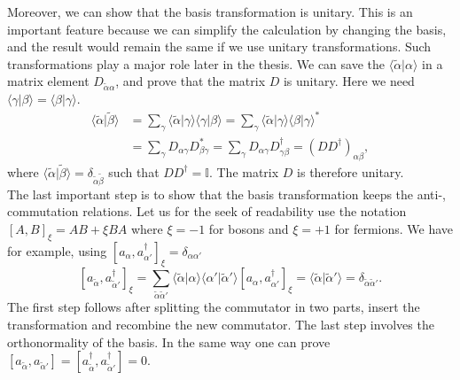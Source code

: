 \documentclass[../main.tex]{subfile}
\begin{document}
Moreover, we can show that the basis transformation is unitary. This is an important feature because we can simplify the calculation by changing the basis, and
the result would remain the same if we use unitary transformations. Such transformations play a major role later in the thesis.
We can save the $\langle \tilde{\alpha} | \alpha\rangle$ in a matrix element $D_{\tilde{\alpha}\alpha}$, and prove that the matrix $D$ is unitary. Here we need
$\langle \gamma | \beta\rangle = \langle \beta | \gamma\rangle$.
\begin{align*}
    \langle \tilde{\alpha} | \tilde{\beta}\rangle  &= \sum_{\gamma} \langle \tilde{\alpha}|\gamma\rangle\langle \gamma | \beta\rangle =  \sum_{\gamma} \langle \tilde{\alpha}|\gamma\rangle \langle \beta | \gamma\rangle^{\ast}\\
    &=\sum_{\gamma} D_{\alpha\gamma}D_{\beta\gamma}^{\ast} = \sum_{\gamma} D_{\alpha\gamma}D^{\dagger}_{\gamma\beta} = (DD^{\dagger})_{\alpha\beta},
\end{align*} 
where $\langle \tilde{\alpha} | \tilde{\beta}\rangle = \delta_{\tilde{\alpha} \tilde{\beta}}$ such that $DD^{\dagger} = \mathbb{I}$. The matrix $D$ is therefore unitary.\\

The last important step is to show that the basis transformation keeps the anti-, commutation relations. Let us for the seek of readability
use the notation $[A,B]_{\xi} = AB + \xi BA$ where $\xi = -1$ for bosons and $\xi = +1$ for fermions. We have for example, using $[a_{\alpha}, a_{\alpha'}^{\dagger}]_{\xi} = \delta_{\alpha\alpha'}$
\[
    [a_{\tilde{\alpha}}, a_{\tilde{\alpha}'}^{\dagger}]_{\xi} = \sum_{\tilde{\alpha}\tilde{\alpha}'} \langle \tilde{\alpha}|\alpha\rangle\langle\alpha'|\tilde{\alpha}'\rangle [a_{\alpha}, a_{\alpha'}^{\dagger}]_{\xi} = \langle \tilde{\alpha}|\tilde{\alpha}'\rangle = \delta_{\tilde{\alpha}\tilde{\alpha}'}.
\]
The first step follows after splitting the commutator in two parts, insert the transformation and recombine the new commutator. 
The last step involves the orthonormality of the basis.
In the same way one can prove $[a_{\tilde{\alpha}},a_{\tilde{\alpha}'}] = [a_{\tilde{\alpha}}^{\dagger},a_{\tilde{\alpha}'}^{\dagger}] = 0$.
  
\end{document}
